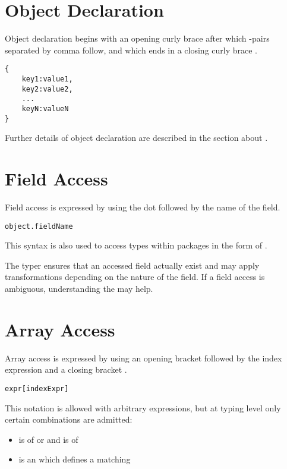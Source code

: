 \section{Object Declaration}
\label{expression-object-declaration}

Object declaration begins with an opening curly brace \expr{\{} after which -pairs separated by comma \expr{,} follow, and which ends in a closing curly brace \expr{\}}.

\begin{lstlisting}
{
	key1:value1,
	key2:value2,
	...
	keyN:valueN
}
\end{lstlisting}
Further details of object declaration are described in the section about .


\section{Field Access}
\label{expression-field-access}

Field access is expressed by using the dot  followed by the name of the field.

\begin{lstlisting}
object.fieldName
\end{lstlisting}

This syntax is also used to access types within packages in the form of .

The typer ensures that an accessed field actually exist and may apply transformations depending on the nature of the field. If a field access is ambiguous, understanding the  may help.


\section{Array Access}
\label{expression-array-access}

Array access is expressed by using an opening bracket \expr{[} followed by the index expression and a closing bracket \expr{]}.

\begin{lstlisting}
expr[indexExpr]
\end{lstlisting}

This notation is allowed with arbitrary expressions, but at typing level only certain combinations are admitted:

\begin{itemize}
	\item {} is of  or  and  is of 
	\item {} is an  which defines a matching 
\end{itemize}


